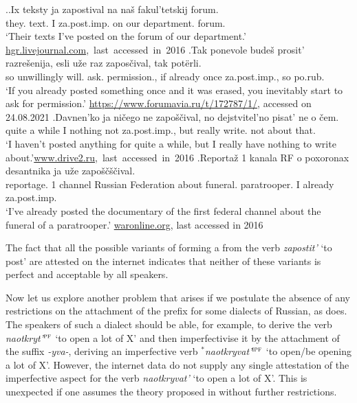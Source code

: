 {\sloppy
\ex.\label{ex:zapostivat}\ag.Ix teksty ja zapostival na na\v{s} fakul'tetskij forum.\\
they. text. I za.post.imp. on our department. forum.\\
\trans `Their texts I've posted on the forum of our department.'\\\hbox{}\hfill\hbox{\url{hgr.livejournal.com}, last accessed in 2016}
\bg.Tak ponevole bude\v{s} prosit' razre\v{s}enija, esli u\v{z}e raz zapos\v{c}ival, tak pot\"{e}rli.\\
so unwillingly will. ask. permission., if already once za.post.imp., so po.rub.\\
\trans `If you already posted something once and it was erased, you inevitably start to ask for permission.' \url{https://www.forumavia.ru/t/172787/1/}, accessed on 24.08.2021
\bg.Davnen'ko ja ni\v{c}ego ne zapo\v{s}\v{c}ival, no dejstvitel'no pisat' ne o \v{c}em.\\
{quite a while} I nothing not za.post.imp., but really write. not about that.\\
\trans `I haven't posted anything for quite a while, but I really have nothing to write about.'\hbox{}\hfill\hbox{\url{www.drive2.ru}, last accessed in 2016}
\bg.Reporta\v{z} 1 kanala RF o poxoronax desantnika ja u\v{z}e zapo\v{s}\v{c}\v{s}\v{c}ival.\\
reportage. 1 channel {Russian Federation} about funeral. paratrooper. I already za.post.imp.\\
\trans `I've already posted the documentary of the first federal channel about the funeral of a paratrooper.' \url{waronline.org}, last accessed in 2016

}\noindent The fact that all the possible variants of forming a  from the verb \textit{zapostit'} `to post' are attested on the internet indicates that neither of these variants is perfect and acceptable by all speakers.

Now let us explore another problem that arises if we postulate the absence of any restrictions on the attachment of the prefix  for some dialects of Russian, as \citet{Tatevosov:13a} does. The speakers of such a dialect should be able, for example, to derive the verb \textit{naotkryt'}$^{\textsc{pf}}$ `to open a lot of X' and then imperfectivise it by the attachment of the suffix \textit{-yva-}, deriving an imperfective verb $^*$\textit{naotkryvat'}$^{\textsc{ipf}}$ `to open/be opening a lot of X'. However, the internet data do not supply any single attestation of the imperfective aspect for the verb \textit{naotkryvat'} `to open a lot of X'. This is unexpected if one assumes the theory proposed in \citet{Tatevosov:13a} without further restrictions.\largerpage

